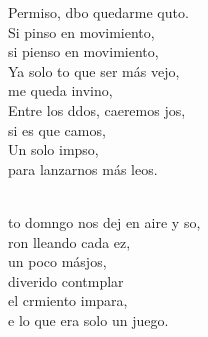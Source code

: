 \documentclass[12pt]{article}
\begin{document}
\begin{multicols*}{2}
\begin{cancion}
        \jump
                Permiso, dbo quedarme quto.\\
                Si pinso en movimiento,\\
        si pienso en movimiento,\\
        \jump
                Ya solo to que ser más vejo, \\
                me queda invino,\\
                Entre los ddos, caeremos jos, \\
                si es que camos,\\
                Un solo impso, \\
                para lanzarnos más leos.\\\jump\\
                \begin{chorus}%
                to domngo nos dej en aire y so, \\
                ron lleando cada ez, \\
                un poco másjos,\\
                 diverido contmplar  \\
                el crmiento impara,\\
                e lo que era solo un juego.\\
                \end{chorus}%
                \jump\\
                    \\
        \end{cancion}%

        \newpage


\end{multicols*}
\end{document}
